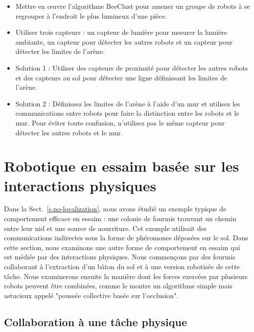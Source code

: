 \begin{framed}
\begin{itemize}
\item Mettre en œuvre l'algorithme BeeClust pour amener un groupe de robots à se regrouper à l'endroit le plus lumineux d'une pièce.
\item Utiliser trois capteurs : un capteur de lumière pour mesurer la lumière ambiante, un capteur pour détecter les autres robots et un capteur pour détecter les limites de l'arène.
\item Solution 1 : Utiliser des capteurs de proximité pour détecter les autres robots et des capteurs au sol pour détecter une ligne définissant les limites de l'arène.
\item Solution 2 : Définissez les limites de l'arène à l'aide d'un mur et utilisez les communications entre robots pour faire la distinction entre les robots et le mur. Pour éviter toute confusion, n'utilisez pas le même capteur pour détecter les autres robots et le mur.
\end{itemize}
\end{framed}

\section[Robot basée sur les interactions physiques]{Robotique en essaim basée sur les interactions physiques}\label{s.swarm-physical}

Dans la Sect.~\ref{s.no-localization}, nous avons étudié un exemple typique de comportement efficace en essaim : une colonie de fourmis trouvant un chemin entre leur nid et une source de nourriture. Cet exemple utilisait des communications indirectes sous la forme de phéromones déposées sur le sol. Dans cette section, nous examinons une autre forme de comportement en essaim qui est médiée par des interactions physiques. Nous commençons par des fourmis collaborant à l'extraction d'un bâton du sol et à une version robotisée de cette tâche. Nous examinerons ensuite la manière dont les forces exercées par plusieurs robots peuvent être combinées, comme le montre un algorithme simple mais astucieux appelé "poussée collective basée sur l'occlusion".

\subsection{Collaboration à une tâche physique}

